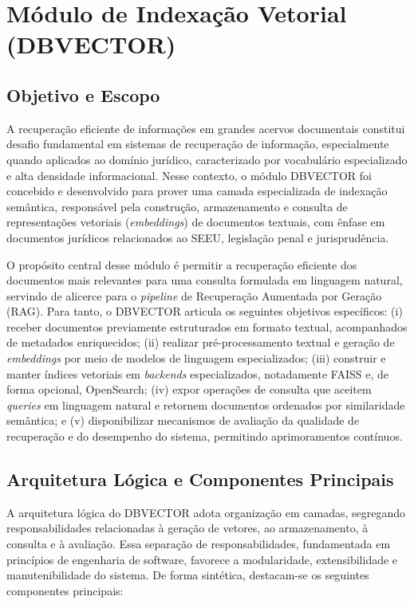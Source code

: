 
\section{Módulo de Indexação Vetorial (DBVECTOR)}
\label{sec:dbvector}

\subsection{Objetivo e Escopo}
A recuperação eficiente de informações em grandes acervos documentais constitui desafio fundamental em sistemas de recuperação de informação, especialmente quando aplicados ao domínio jurídico, caracterizado por vocabulário especializado e alta densidade informacional. Nesse contexto, o módulo DBVECTOR foi concebido e desenvolvido para prover uma camada especializada de indexação semântica, responsável pela construção, armazenamento e consulta de representações vetoriais (\textit{embeddings}) de documentos textuais, com ênfase em documentos jurídicos relacionados ao SEEU, legislação penal e jurisprudência.

O propósito central desse módulo é permitir a recuperação eficiente dos documentos mais relevantes para uma consulta formulada em linguagem natural, servindo de alicerce para o \textit{pipeline} de Recuperação Aumentada por Geração (RAG). Para tanto, o DBVECTOR articula os seguintes objetivos específicos: (i) receber documentos previamente estruturados em formato textual, acompanhados de metadados enriquecidos; (ii) realizar pré-processamento textual e geração de \textit{embeddings} por meio de modelos de linguagem especializados; (iii) construir e manter índices vetoriais em \textit{backends} especializados, notadamente FAISS e, de forma opcional, OpenSearch; (iv) expor operações de consulta que aceitem \textit{queries} em linguagem natural e retornem documentos ordenados por similaridade semântica; e (v) disponibilizar mecanismos de avaliação da qualidade de recuperação e do desempenho do sistema, permitindo aprimoramentos contínuos.

\subsection{Arquitetura Lógica e Componentes Principais}
A arquitetura lógica do DBVECTOR adota organização em camadas, segregando responsabilidades relacionadas à geração de vetores, ao armazenamento, à consulta e à avaliação. Essa separação de responsabilidades, fundamentada em princípios de engenharia de software, favorece a modularidade, extensibilidade e manutenibilidade do sistema. De forma sintética, destacam-se os seguintes componentes principais:

